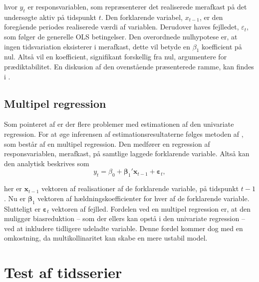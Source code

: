 \documentclass[
  a4paper,
  oneside]{memoir}
\begin{document}
hvor \(y_t\) er responsvariablen, som repræsenterer det realiserede merafkast på det undersøgte aktiv på tidspunkt \(t\). Den forklarende variabel, \(x_{t-1}\), er den foregående periodes realiserede værdi af variablen. Derudover haves fejlledet, \(\varepsilon_t\), som følger de generelle OLS betingelser. Den overordnede nulhypotese er, at ingen tidsvariation eksisterer i merafkast, dette vil betyde en \(\beta_1\) koefficient på nul. Altså vil en koefficient, signifikant forskellig fra nul, argumentere for prædiktabilitet. En diskusion af den ovenstående præsenterede ramme, kan findes i \citep{Stambaugh1999}.

\hypertarget{multregr}{%
\subsection{Multipel regression}\label{multregr}}

Som pointeret af \citep{Stambaugh1999} er der flere problemer med estimationen af den univariate regression. For at øge inferensen af estimationsresultaterne følges metoden af \citep{Goyal2007}, som består af en multipel regression. Den medfører en regression af responsvariablen, merafkast, på samtlige laggede forklarende variable. Altså kan den analytisk beskrives som
\[y_t=\beta_0+\bm{\beta}_1'\bm{x}_{t-1}+\bm{\varepsilon}_t,\]

her er \(\bm{x}_{t-1}\) vektoren af realisationer af de forklarende variable, på tidspunkt \(t-1\). Nu er \(\bm{\beta}_1\) vektoren af hældningskoefficienter for hver af de forklarende variable. Slutteligt er \(\bm{\varepsilon}_t\) vektoren af fejlled. Fordelen ved en multipel regression er, at den muliggør biasreduktion -- som der ellers kan opstå i den univariate regression -- ved at inkludere tidligere udeladte variable. Denne fordel kommer dog med en omkostning, da multikollinaritet kan skabe en mere ustabil model.

\hypertarget{sektestaftids}{%
\section{Test af tidsserier}\label{sektestaftids}}
\end{document}
